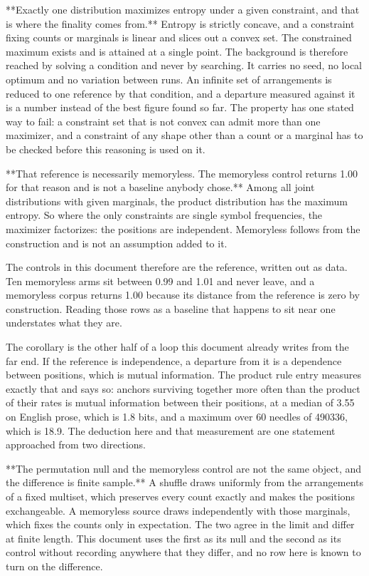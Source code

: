 **Exactly one distribution maximizes entropy under a given constraint, and that is where the finality comes from.** Entropy is strictly concave, and a constraint fixing counts or marginals is linear and slices out a convex set. The constrained maximum exists and is attained at a single point. The background is therefore reached by solving a condition and never by searching. It carries no seed, no local optimum and no variation between runs. An infinite set of arrangements is reduced to one reference by that condition, and a departure measured against it is a number instead of the best figure found so far. The property has one stated way to fail: a constraint set that is not convex can admit more than one maximizer, and a constraint of any shape other than a count or a marginal has to be checked before this reasoning is used on it.

**That reference is necessarily memoryless. The memoryless control returns 1.00 for that reason and is not a baseline anybody chose.** Among all joint distributions with given marginals, the product distribution has the maximum entropy. So where the only constraints are single symbol frequencies, the maximizer factorizes: the positions are independent. Memoryless follows from the construction and is not an assumption added to it.

The controls in this document therefore are the reference, written out as data. Ten memoryless arms sit between 0.99 and 1.01 and never leave, and a memoryless corpus returns 1.00 because its distance from the reference is zero by construction. Reading those rows as a baseline that happens to sit near one understates what they are.

The corollary is the other half of a loop this document already writes from the far end. If the reference is independence, a departure from it is a dependence between positions, which is mutual information. The product rule entry measures exactly that and says so: anchors surviving together more often than the product of their rates is mutual information between their positions, at a median of 3.55 on English prose, which is 1.8 bits, and a maximum over 60 needles of 490336, which is 18.9. The deduction here and that measurement are one statement approached from two directions.

**The permutation null and the memoryless control are not the same object, and the difference is finite sample.** A shuffle draws uniformly from the arrangements of a fixed multiset, which preserves every count exactly and makes the positions exchangeable. A memoryless source draws independently with those marginals, which fixes the counts only in expectation. The two agree in the limit and differ at finite length. This document uses the first as its null and the second as its control without recording anywhere that they differ, and no row here is known to turn on the difference.

